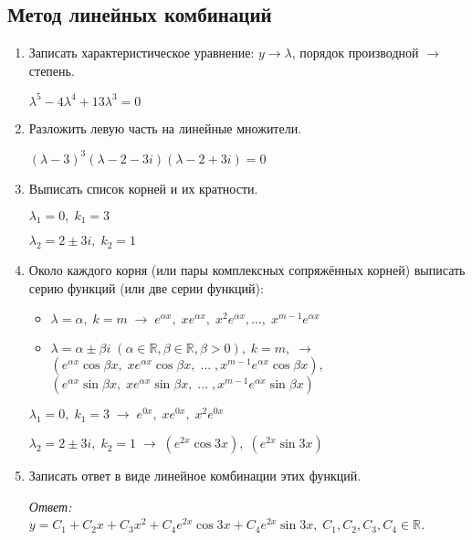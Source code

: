 \documentclass[10pt, a4paper]{article}
\begin{document}
\subsection{Метод линейных комбинаций}
\begin{enumerate}
    \item Записать характеристическое уравнение: $y \rightarrow \lambda$, порядок производной $\rightarrow$ степень.
        \par $\lambda^5 - 4\lambda^4 + 13\lambda^3 = 0$
    \item Разложить левую часть на линейные множители. \par $(\lambda - 3)^3(\lambda - 2 - 3i)(\lambda - 2 + 3i) = 0$
    \item Выписать список корней и их кратности.
        \par $\lambda_1 = 0,\;k_1 = 3$
        \par $\lambda_2 = 2 \pm 3i,\;k_2 = 1$
    \item Около каждого корня (или пары комплексных сопряжённых корней) выписать серию функций (или две серии функций):
    \begin{itemize}
        \item $\lambda = \alpha,\;k = m\;\rightarrow\;e^{\alpha x}, \;
              xe^{\alpha x},\;x^2e^{\alpha x}, \dots,\;x^{m - 1}e^{\alpha x}$
        \item $\lambda = \alpha \pm \beta i\;(\alpha \in \mathbb{R}, \beta \in \mathbb{R}, \beta > 0),\;k = m,\;\rightarrow\;$ \\
              $(e^{\alpha x}\cos{\beta x},\;x e^{\alpha x}\cos{\beta x},\;\dots\;, x^{m - 1} e^{\alpha x}\cos{\beta x}),$ \\
              $(e^{\alpha x}\sin{\beta x},\;x e^{\alpha x}\sin{\beta x},\;\dots\;, x^{m - 1} e^{\alpha x}\sin{\beta x})$
    \end{itemize}
        \par $\lambda_1 = 0,\;k_1 = 3\;\rightarrow \;
             e^{0x},\;xe^{0x},\;x^2e^{0x}$
        \par $\lambda_2 = 2 \pm 3i,\;k_2 = 1\;\rightarrow \;
             (e^{2x}\cos{3x}),\;(e^{2x}\sin{3x})$
    \item Записать ответ в виде линейное комбинации этих функций.
        \par\textit{Ответ: $y = C_1 + C_2x + C_3x^2 + C_4e^{2x}\cos{3x} + C_4e^{2x}\sin{3x},\;
                   C_1, C_2, C_3, C_4 \in \mathbb{R}$.}
\end{enumerate}
\end{document}
